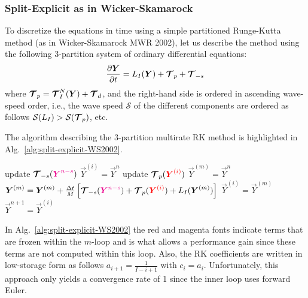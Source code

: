 \documentclass{report}
\begin{document}
{\subsubsection{Split-Explicit as in Wicker-Skamarock}
To discretize the equations in time using a simple partitioned Runge-Kutta method (as in Wicker-Skamarock MWR 2002), let us describe the method using the following 3-partition system of ordinary differential equations:
\[
\frac{\partial \boldsymbol{{Y}}}{\partial t}= L_I(\boldsymbol{{Y}}) + \boldsymbol{{\mathcal{T}}}_{p} + \boldsymbol{{\mathcal{T}}}_{-s}
\]
where $\boldsymbol{{\mathcal{T}}}_{p}=\boldsymbol{{\mathcal{T}}}^N_{I}(\boldsymbol{{Y}}) + \boldsymbol{{\mathcal{T}}}_{d}$, and the right-hand side is ordered in ascending wave-speed order, i.e., 
the wave speed $\mathcal{S}$ of the different components are ordered as follows $\mathcal{S}(L_I) > \mathcal{S}(\boldsymbol{{\mathcal{T}}}_{p})$, etc.

The algorithm describing the 3-partition multirate RK method is highlighted in Alg.\ \ref{alg:split-explicit-WS2002}.
\begin{algorithm}
\label{alg:split-explicit-WS2002}
\begin{algorithmic}
\State
{}
\State update $\boldsymbol{{\mathcal{T}}}_{-s}(\textcolor{magenta}{ \boldsymbol{{Y}}^{n-s}})$
\State $\vec{Y}^{(i)}=\vec{Y}^n$ 
\State update $\boldsymbol{{\mathcal{T}}}_{p}(\textcolor{red}{ \boldsymbol{{Y}}^{(i)} })$
\State $\vec{Y}^{(m)}=\vec{Y}^{n}$ 
\State $\boldsymbol{{Y}}^{(m)}=\boldsymbol{{Y}}^{(m)} + \frac{\Delta t}{M} \left[ \boldsymbol{{\mathcal{T}}}_{-s}(\textcolor{magenta}{ \boldsymbol{{Y}}^{n-s} }) + \boldsymbol{{\mathcal{T}}}_{p}(\textcolor{red}{ \boldsymbol{{Y}}^{(i)}}) + L_I(\boldsymbol{{Y}}^{(m)}) \right]$
\EndFor %
\State $\vec{Y}^{(i)}=\vec{Y}^{(m)}$
\EndFor %
\State $\vec{Y}^{n+1}=\vec{Y}^{(i)}$
\EndFunction
\end{algorithmic}
\end{algorithm}
In Alg.\ \ref{alg:split-explicit-WS2002} the red and magenta fonts indicate terms that are frozen within the $m$-loop and is what allows a performance gain since these terms are not computed within this loop. Also, 
the RK coefficients are written in low-storage form as follows $a_{i+1}=\frac{1}{I-i+1}$ with $c_i=a_i$. Unfortunately, this approach only yields a convergence rate of 1 since the inner loop uses forward Euler.

}
\end{document}
